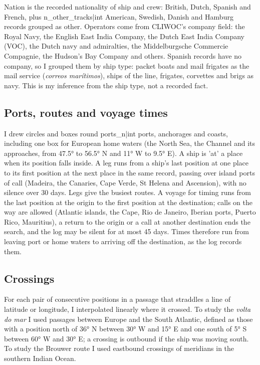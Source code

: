 \documentclass[11pt,a4paper]{article}
\begin{document}
Nation is the recorded nationality of ship and crew: British, Dutch, Spanish and French, plus {{n_other_tracks|int}} American, Swedish, Danish and Hamburg records grouped as other. Operators come from CLIWOC's company field: the Royal Navy, the English East India Company, the Dutch East India Company (VOC), the Dutch navy and admiralties, the Middelburgsche Commercie Compagnie, the Hudson's Bay Company and others. Spanish records have no company, so I grouped them by ship type: packet boats and mail frigates as the mail service (\emph{correos marítimos}), ships of the line, frigates, corvettes and brigs as navy. This is my inference from the ship type, not a recorded fact.

\subsection{Ports, routes and voyage times}
I drew circles and boxes round {{ports_n|int}} ports, anchorages and coasts, including one box for European home waters (the North Sea, the Channel and its approaches, from 47.5° to 56.5° N and 11° W to 9.5° E). A ship is 'at' a place when its position falls inside. A leg runs from a ship's last position at one place to its first position at the next place in the same record, passing over island ports of call (Madeira, the Canaries, Cape Verde, St Helena and Ascension), with no silence over 30 days. Legs give the busiest routes. A voyage for timing runs from the last position at the origin to the first position at the destination; calls on the way are allowed (Atlantic islands, the Cape, Rio de Janeiro, Iberian ports, Puerto Rico, Mauritius), a return to the origin or a call at another destination ends the search, and the log may be silent for at most 45 days. Times therefore run from leaving port or home waters to arriving off the destination, as the log records them.

\subsection{Crossings}
For each pair of consecutive positions in a passage that straddles a line of latitude or longitude, I interpolated linearly where it crossed. To study the \emph{volta do mar} I used passages between Europe and the South Atlantic, defined as those with a position north of 36° N between 30° W and 15° E and one south of 5° S between 60° W and 30° E; a crossing is outbound if the ship was moving south. To study the Brouwer route I used eastbound crossings of meridians in the southern Indian Ocean.
\end{document}
